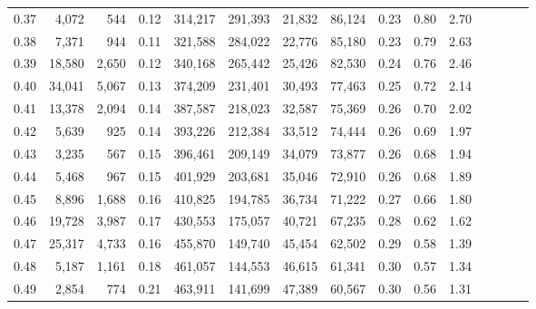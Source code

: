 \begin{tabular}{rrrcrrrrrrrrrrr}
0.37 &   4,072 &    544 &                                       0.12 &  314,217 &  291,393 &   21,832 &   86,124 &  0.23 &  0.80 &                         2.70 \\
0.38 &   7,371 &    944 &                                       0.11 &  321,588 &  284,022 &   22,776 &   85,180 &  0.23 &  0.79 &                         2.63 \\
0.39 &  18,580 &  2,650 &                                       0.12 &  340,168 &  265,442 &   25,426 &   82,530 &  0.24 &  0.76 &                         2.46 \\
0.40 &  34,041 &  5,067 &                                       0.13 &  374,209 &  231,401 &   30,493 &   77,463 &  0.25 &  0.72 &                         2.14 \\
0.41 &  13,378 &  2,094 &                                       0.14 &  387,587 &  218,023 &   32,587 &   75,369 &  0.26 &  0.70 &                         2.02 \\
0.42 &   5,639 &    925 &                                       0.14 &  393,226 &  212,384 &   33,512 &   74,444 &  0.26 &  0.69 &                         1.97 \\
0.43 &   3,235 &    567 &                                       0.15 &  396,461 &  209,149 &   34,079 &   73,877 &  0.26 &  0.68 &                         1.94 \\
0.44 &   5,468 &    967 &                                       0.15 &  401,929 &  203,681 &   35,046 &   72,910 &  0.26 &  0.68 &                         1.89 \\
0.45 &   8,896 &  1,688 &                                       0.16 &  410,825 &  194,785 &   36,734 &   71,222 &  0.27 &  0.66 &                         1.80 \\
0.46 &  19,728 &  3,987 &                                       0.17 &  430,553 &  175,057 &   40,721 &   67,235 &  0.28 &  0.62 &                         1.62 \\
0.47 &  25,317 &  4,733 &                                       0.16 &  455,870 &  149,740 &   45,454 &   62,502 &  0.29 &  0.58 &                         1.39 \\
0.48 &   5,187 &  1,161 &                                       0.18 &  461,057 &  144,553 &   46,615 &   61,341 &  0.30 &  0.57 &                         1.34 \\
0.49 &   2,854 &    774 &                                       0.21 &  463,911 &  141,699 &   47,389 &   60,567 &  0.30 &  0.56 &                         1.31 \\

\end{tabular}

